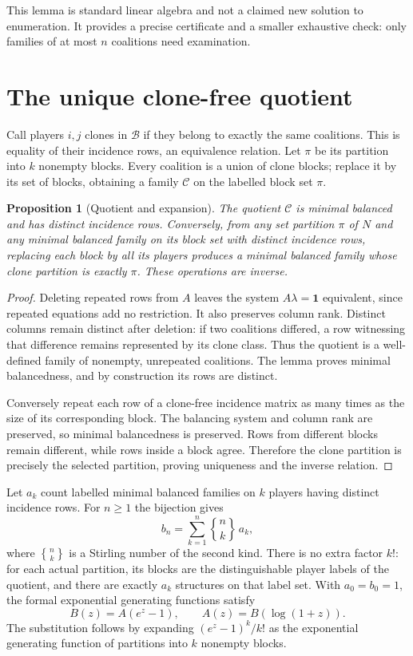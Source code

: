 \documentclass[11pt,a4paper]{article}
\newtheorem{proposition}[theorem]{Proposition}
\begin{document}
This lemma is standard linear algebra and not a claimed new solution to enumeration. It provides a precise certificate and a smaller exhaustive check: only families of at most $n$ coalitions need examination.

\section{The unique clone-free quotient}
Call players $i,j$ clones in $\mathcal B$ if they belong to exactly the same coalitions. This is equality of their incidence rows, an equivalence relation. Let $\pi$ be its partition into $k$ nonempty blocks. Every coalition is a union of clone blocks; replace it by its set of blocks, obtaining a family $\mathcal C$ on the labelled block set $\pi$.

\begin{proposition}[Quotient and expansion]
The quotient $\mathcal C$ is minimal balanced and has distinct incidence rows. Conversely, from any set partition $\pi$ of $N$ and any minimal balanced family on its block set with distinct incidence rows, replacing each block by all its players produces a minimal balanced family whose clone partition is exactly $\pi$. These operations are inverse.
\end{proposition}
\begin{proof}
Deleting repeated rows from $A$ leaves the system $A\lambda=\mathbf1$ equivalent, since repeated equations add no restriction. It also preserves column rank. Distinct columns remain distinct after deletion: if two coalitions differed, a row witnessing that difference remains represented by its clone class. Thus the quotient is a well-defined family of nonempty, unrepeated coalitions. The lemma proves minimal balancedness, and by construction its rows are distinct.

Conversely repeat each row of a clone-free incidence matrix as many times as the size of its corresponding block. The balancing system and column rank are preserved, so minimal balancedness is preserved. Rows from different blocks remain different, while rows inside a block agree. Therefore the clone partition is precisely the selected partition, proving uniqueness and the inverse relation.
\end{proof}

Let $a_k$ count labelled minimal balanced families on $k$ players having distinct incidence rows. For $n\ge1$ the bijection gives
\[
 \boxed{b_n=\sum_{k=1}^n {n\brace k}\,a_k},              \tag{1}
\]
where ${n\brace k}$ is a Stirling number of the second kind. There is no extra factor $k!$: for each actual partition, its blocks are the distinguishable player labels of the quotient, and there are exactly $a_k$ structures on that label set. With $a_0=b_0=1$, the formal exponential generating functions satisfy
\[
 B(z)=A(e^z-1),\qquad A(z)=B(\log(1+z)).                  \tag{2}
\]
The substitution follows by expanding $(e^z-1)^k/k!$ as the exponential generating function of partitions into $k$ nonempty blocks.
\end{document}
